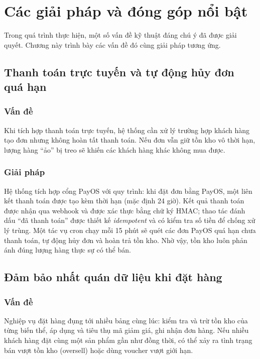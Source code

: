 \chapter{Các giải pháp và đóng góp nổi bật}
\label{ch:contrib}

Trong quá trình thực hiện, một số vấn đề kỹ thuật đáng chú ý đã được giải quyết. Chương này
trình bày các vấn đề đó cùng giải pháp tương ứng.

\section{Thanh toán trực tuyến và tự động hủy đơn quá hạn}

\subsection{Vấn đề}
Khi tích hợp thanh toán trực tuyến, hệ thống cần xử lý trường hợp khách hàng tạo đơn nhưng
không hoàn tất thanh toán. Nếu đơn vẫn giữ tồn kho vô thời hạn, lượng hàng ``ảo'' bị treo sẽ
khiến các khách hàng khác không mua được.

\subsection{Giải pháp}
Hệ thống tích hợp cổng PayOS với quy trình: khi đặt đơn bằng PayOS, một liên kết thanh toán
được tạo kèm thời hạn (mặc định 24 giờ). Kết quả thanh toán được nhận qua webhook và được xác
thực bằng chữ ký HMAC; thao tác đánh dấu ``đã thanh toán'' được thiết kế \textit{idempotent} và
có kiểm tra số tiền để chống xử lý trùng. Một tác vụ cron chạy mỗi 15 phút sẽ quét các đơn PayOS
quá hạn chưa thanh toán, tự động hủy đơn và hoàn trả tồn kho. Nhờ vậy, tồn kho luôn phản ánh
đúng lượng hàng thực sự có thể bán.

\section{Đảm bảo nhất quán dữ liệu khi đặt hàng}

\subsection{Vấn đề}
Nghiệp vụ đặt hàng đụng tới nhiều bảng cùng lúc: kiểm tra và trừ tồn kho của từng biến thể, áp
dụng và tiêu thụ mã giảm giá, ghi nhận đơn hàng. Nếu nhiều khách hàng đặt cùng một sản phẩm
gần như đồng thời, có thể xảy ra tình trạng bán vượt tồn kho (oversell) hoặc dùng voucher vượt
giới hạn.

